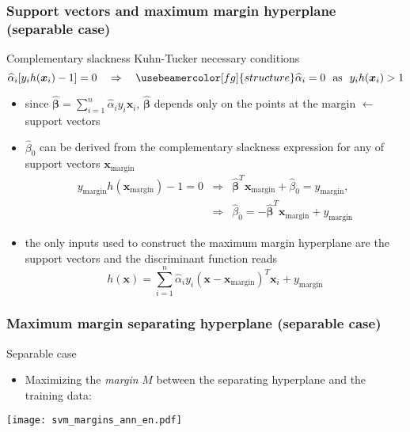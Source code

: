 \documentclass[compress, smaller, serif, 9pt]{beamer}
\newcommand{\structuretext}[1]{{\usebeamercolor[fg]{structure} #1}}
\newcommand{\doigt}{\structuretext{\noindent \Pisymbol{pzd}{43}}}
\newcommand{\doigtr}{\alert{\noindent \Pisymbol{pzd}{43}}}
\newcommand{\bx}{{\boldsymbol{x}}}
\newcommand{\bbeta}{{\boldsymbol{\beta}}}
\begin{document}
\begin{frame}
   \frametitle{Support vectors and  maximum margin hyperplane (separable case)}
   


   \begin{block}{Complementary slackness Kuhn-Tucker necessary conditions}  %
   $$\widehat{\alpha}_i [ y_i h(\bx_i) -1]=0 \quad \Rightarrow \quad \structuretext{ \widehat{\alpha}_i=0  \ \textrm{  as  } \ y_i h(\bx_i) >1}$$
   \begin{itemize}
 \item since  $\widehat{\bbeta} = \sum_{i=1}^n \widehat{\alpha}_i y_i \bx_i$,  $\widehat{\bbeta}$ depends only on the points at the margin $\leftarrow$ \structuretext{support vectors}
 \item $\widehat{\beta}_0$ can be derived from the  complementary slackness expression for any of support vectors $\bx_{\textrm{margin}}$
 $$\begin{array}{lll}
     y_{\textrm{margin}} h( \bx_{\textrm{margin}} ) - 1  = 0& 
     \Rightarrow & \widehat{\bbeta}^T \bx_{\textrm{margin}} + \widehat{\beta}_0 = y_{\textrm{margin}},\\
     & \Rightarrow & \widehat{\beta}_0 = -\widehat{\bbeta}^T \bx_{\textrm{margin}} +  y_{\textrm{margin}}
   \end{array}$$
 \item[\doigtr] the only \alert{inputs used to construct the maximum margin hyperplane} are the  \alert{support vectors} and the discriminant function reads
 $$h(\bx)= \sum_{i=1}^n \widehat{\alpha}_i y_i (\bx- \bx_{\textrm{margin}})^T \bx_i +  y_{\textrm{margin}}$$
 \end{itemize}
  \end{block}


\end{frame}  
    
    
    
  \begin{frame}
   \frametitle{Maximum margin separating hyperplane (separable case)}  
      
       \begin{block}{Separable case}
      \begin{itemize}
      \item[\doigt] Maximizing the  {\em margin} $M$ between the 
      separating hyperplane and the training data:
      \end{itemize}
    \end{block}

   \begin{center}
      \texttt{[image: svm\_margins\_ann\_en.pdf]}
   \end{center}
\end{frame}
\end{document}
